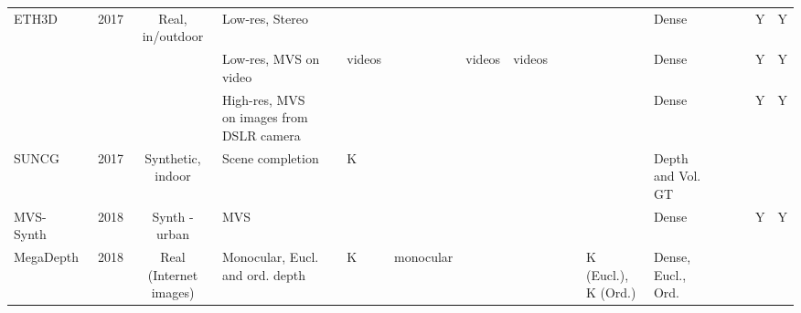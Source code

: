 \documentclass[10pt,journal,compsoc]{IEEEtran}
\begin{document}
\begin{table*}[t]
{\begin{tabular}{@{}p{8.5em}@{ }c@{ } c@{ }p{11.915em}c@{ }p{7.5em}@{ }p{5.335em}@{ }p{5.5em}c@{ }c@{ }l@{ }p{8.665em}lll @{ }l  @{ }l@{ }l@{}}
 
   {ETH3D~\cite{schops2017multi}} & \multicolumn{1}{c}{2017} & \multicolumn{1}{p{7em}}{Real, in/outdoor} & \multicolumn{1}{p{11.915em}}{Low-res, Stereo} & \multicolumn{1}{c}{ } & \multicolumn{1}{p{7.5em}}{} & \multicolumn{1}{p{5.335em}}{} & \multicolumn{1}{p{5.585em}}{} & \multicolumn{1}{c}{} &  & \multicolumn{1}{l}{} & \multicolumn{1}{l}{} & \multicolumn{1}{l}{Dense} &  &  &  &\multicolumn{1}{l}{Y} & \multicolumn{1}{l}{Y} \\
    \cline{4-18}

      &   &   & \multicolumn{1}{p{11.915em}}{Low-res, MVS on video} & \multicolumn{1}{c}{ } & \multicolumn{1}{p{7.5em}}{ videos} & \multicolumn{1}{p{5.335em}}{} & \multicolumn{1}{p{5.585em}}{ videos} & \multicolumn{1}{c}{ videos} & & \multicolumn{1}{l}{} & \multicolumn{1}{l}{} & \multicolumn{1}{l}{Dense} &  &  & & \multicolumn{1}{l}{Y} & \multicolumn{1}{l}{Y} \\
    \cline{4-18}
    
    &  & & \multicolumn{1}{p{11.915em}}{High-res, MVS on images from DSLR camera} & \multicolumn{1}{c}{ } & \multicolumn{1}{p{7.5em}}{} & \multicolumn{1}{p{5.335em}}{} & \multicolumn{1}{p{5.585em}}{} & \multicolumn{1}{c}{} & & \multicolumn{1}{l}{} & \multicolumn{1}{l}{} & \multicolumn{1}{l}{Dense} &  &  & & \multicolumn{1}{l}{Y} & \multicolumn{1}{l}{Y} \\
    \hline
    
        {SUNCG~\cite{song2017semantic}} & \multicolumn{1}{c}{2017} & \multicolumn{1}{p{7em}}{Synthetic, indoor} & \multicolumn{1}{p{11.915em}}{Scene completion} & \multicolumn{1}{c}{} & \multicolumn{1}{p{7.5em}}{K} & \multicolumn{1}{p{5.335em}}{} & \multicolumn{1}{p{5.585em}}{} & \multicolumn{1}{c}{} &  & \multicolumn{1}{l}{} & \multicolumn{1}{l}{} &   \multicolumn{1}{p{2cm}}{Depth and Vol. GT} &  &  & &\multicolumn{1}{r}{} & \multicolumn{1}{r}{} \\
    \hline


       {MVS-Synth~\cite{huang2018deepmvs}} & \multicolumn{1}{c}{2018} & \multicolumn{1}{p{7em}}{Synth - urban} & \multicolumn{1}{p{11.915em}}{MVS} & \multicolumn{1}{c}{ } & \multicolumn{1}{p{7.5em}}{} & \multicolumn{1}{p{5.335em}}{} & \multicolumn{1}{c}{} & \multicolumn{1}{c}{} & &\multicolumn{1}{l}{}  & \multicolumn{1}{l}{} & Dense &  &  & &\multicolumn{1}{l}{Y} & \multicolumn{1}{l}{Y} \\
    \hline

  
    {MegaDepth~\cite{Li_2018_CVPR} } & \multicolumn{1}{c}{2018} & \multicolumn{1}{p{7em}}{Real (Internet images)} & \multicolumn{1}{p{11.915em}}{Monocular,  Eucl. and ord. depth} & \multicolumn{1}{c}{} & \multicolumn{1}{p{7.5em}}{K} & \multicolumn{1}{p{5.335em}}{monocular} & \multicolumn{1}{p{5.585em}}{} & \multicolumn{1}{c}{} & & \multicolumn{1}{l}{} &  \multicolumn{1}{p{6em}}{K (Eucl.), K (Ord.)} &   \multicolumn{1}{p{2cm}}{Dense, Eucl., Ord.} &  &  & & \multicolumn{1}{r}{} & \multicolumn{1}{r}{} \\
 

\end{tabular}}
\end{table*}
\end{document}
